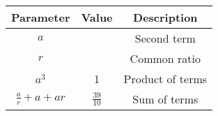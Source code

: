 \begin{tabular}{|c|c|c|}
        \hline
        \textbf{Parameter} & \textbf{Value} & \textbf{Description} \\
        \hline
        $a$ & & Second term \\
        \hline
        $r$ & & Common ratio \\
        \hline
        $a^3$ & 1 & Product of terms \\
        \hline
        $\frac{a}{r} + a + ar$ & $\frac{39}{10}$ & Sum of terms \\
        \hline
    \end{tabular}
